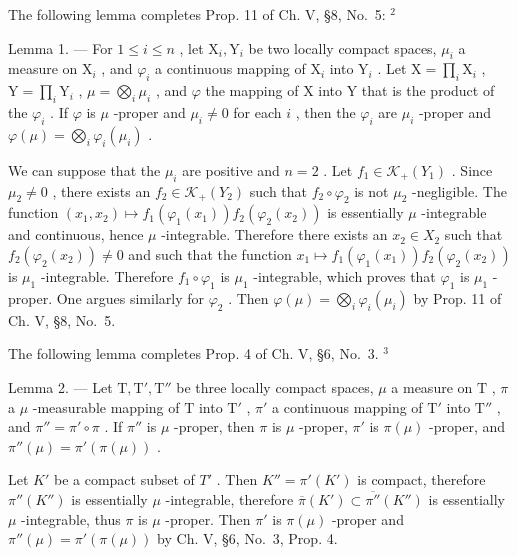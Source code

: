 The following lemma completes Prop. 11 of Ch. V, §8, No.~5: \(^{2}\)

Lemma 1. --- For \(1 \leqslant i \leqslant n\) , let \(\mathrm{X}_i, \mathrm{Y}_i\) be two locally compact spaces, \(\mu_i\) a measure on \(\mathrm{X}_i\) , and \(\varphi_i\) a continuous mapping of \(\mathrm{X}_i\) into \(\mathrm{Y}_i\) . Let \(\mathrm{X} = \prod_i \mathrm{X}_i\) , \(\mathrm{Y} = \prod_i \mathrm{Y}_i\) , \(\mu = \bigotimes_i \mu_i\) , and \(\varphi\) the mapping of \(\mathrm{X}\) into \(\mathrm{Y}\) that is the product of the \(\varphi_i\) . If \(\varphi\) is \(\mu\) -proper and \(\mu_i \neq 0\) for each \(i\) , then the \(\varphi_i\) are \(\mu_i\) -proper and \(\varphi(\mu) = \bigotimes_i \varphi_i(\mu_i)\) .

We can suppose that the \(\mu_{i}\) are positive and \(n = 2\) . Let \(f_{1} \in \mathcal{K}_{+}(Y_{1})\) . Since \(\mu_{2} \neq 0\) , there exists an \(f_{2} \in \mathcal{K}_{+}(Y_{2})\) such that \(f_{2} \circ \varphi_{2}\) is not \(\mu_{2}\) -negligible. The function \((x_{1}, x_{2}) \mapsto f_{1}(\varphi_{1}(x_{1})) f_{2}(\varphi_{2}(x_{2}))\) is essentially \(\mu\) -integrable and continuous, hence \(\mu\) -integrable. Therefore there exists an \(x_{2} \in X_{2}\) such that \(f_{2}(\varphi_{2}(x_{2})) \neq 0\) and such that the function \(x_{1} \mapsto f_{1}(\varphi_{1}(x_{1})) f_{2}(\varphi_{2}(x_{2}))\) is \(\mu_{1}\) -integrable. Therefore \(f_{1} \circ \varphi_{1}\) is \(\mu_{1}\) -integrable, which proves that \(\varphi_{1}\) is \(\mu_{1}\) -proper. One argues similarly for \(\varphi_{2}\) . Then \(\varphi(\mu) = \bigotimes_{i} \varphi_{i}(\mu_{i})\) by Prop. 11 of Ch. V, §8, No.~5.

The following lemma completes Prop. 4 of Ch. V, §6, No.~3. \(^{3}\)

Lemma 2. --- Let \(\mathrm{T}, \mathrm{T}', \mathrm{T}''\) be three locally compact spaces, \(\mu\) a measure on \(\mathrm{T}\) , \(\pi\) a \(\mu\) -measurable mapping of \(\mathrm{T}\) into \(\mathrm{T}'\) , \(\pi'\) a continuous mapping of \(\mathrm{T}'\) into \(\mathrm{T}''\) , and \(\pi'' = \pi' \circ \pi\) . If \(\pi''\) is \(\mu\) -proper, then \(\pi\) is \(\mu\) -proper, \(\pi'\) is \(\pi(\mu)\) -proper, and \(\pi''(\mu) = \pi' (\pi(\mu))\) .

Let \(K'\) be a compact subset of \(T'\) . Then \(K'' = \pi'(K')\) is compact, therefore \(\pi''(K'')\) is essentially \(\mu\) -integrable, therefore \(\overline{\pi}(K') \subset \overline{\pi''}(K'')\) is essentially \(\mu\) -integrable, thus \(\pi\) is \(\mu\) -proper. Then \(\pi'\) is \(\pi(\mu)\) -proper and \(\pi''(\mu) = \pi'(\pi(\mu))\) by Ch. V, §6, No.~3, Prop. 4.

